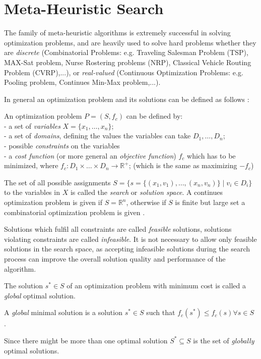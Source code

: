 \section{Meta-Heuristic Search}\label{sec:meta}
The family of meta-heuristic algorithms is extremely successful in solving optimization problems, and are heavily used to solve hard problems whether they are  \emph{discrete} (Combinatorial Problems: e.g. Traveling Salesman Problem (TSP), MAX-Sat problem, Nurse Rostering problems (NRP), Classical Vehicle Routing Problem (CVRP),...), or \emph{real-valued} (Continuous Optimization Problems: e.g. Pooling problem, Continues Min-Max problem,...).

In general an optimization problem and its solutions can be defined as follows  \cite{blum2003metaheuristics}: 
\begin{definition}\label{def:problem}
An optimization problem $P = (S, f_c)$ can be defined by:\\
- a set of \emph{variables} $X = \{x_1,\dots,x_n\} $;\\
- a set of \emph{domains}, defining the values the variables can take $D_1,\dots,D_n$;\\
- possible \emph{constraints} on the variables\\
- a \emph{cost function} (or more general an \emph{objective function}) $f_c$ which has to be minimized, where $f_c:D_1 \times \dots \times D_n \rightarrow \mathbb{R}^+$; (which is the same as maximizing $-f_c$)\\
\end{definition}
The set of all possible assignments $S = \{s = \{(x_1,v_1),\dots,(x_n,v_n)\}\mid v_i \in D_i\}$ to the variables in $X$ is called the \emph{search} or \emph{solution space}.
A continues optimization problem is given if $S=\mathbb{R}^n$, otherwise if $S$ is finite but large set a combinatorial optimization problem is given \cite{VNS}. 

Solutions which fulfil all constraints are called \emph{feasible} solutions, solutions violating constraints are called \emph{infeasible}. 
It is not necessary to allow only feasible solutions in the search space, as accepting infeasible solutions during the search process can improve the overall solution quality and performance of the algorithm.

The solution $s^*\in S$ of an optimization problem with minimum cost is called a \emph{global} optimal solution. 
\begin{definition}
 A \emph{global} minimal solution is a solution $s^* \in S$ such that
 $f_c(s^*)\leq f_c(s) \forall s \in S$ \cite{blum2003metaheuristics}. 
\end{definition}
Since there might be more than one optimal solution $S^* \subseteq S$ is the set of \emph{globally} optimal solutions.

